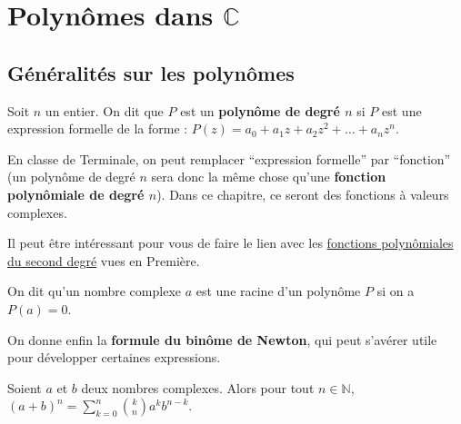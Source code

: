 	\section{Polynômes dans \texorpdfstring{$\mathbb{C}$}{C}}

	\subsection{Généralités sur les polynômes}

	\begin{formula}[Définition]
		Soit $n$ un entier. On dit que $P$ est un \textbf{polynôme de degré $n$} si $P$ est une expression formelle de la forme : $P(z) = a_0 + a_1 z + a_2 z^2 + \dots + a_n z^n$.
	\end{formula}

	En classe de Terminale, on peut remplacer ``expression formelle'' par ``fonction'' (un polynôme de degré $n$ sera donc la même chose qu'une \textbf{fonction polynômiale de degré $n$}). Dans ce chapitre, ce seront des fonctions à valeurs complexes.

	\begin{tip}
		Il peut être intéressant pour vous de faire le lien avec les \href{https://bacomathiqu.es/cours/premiere/polynomes-second-degre/}{fonctions polynômiales du second degré} vues en Première.
	\end{tip}

	\begin{formula}
		On dit qu'un nombre complexe $a$ est une racine d'un polynôme $P$ si on a $P(a) = 0$.
	\end{formula}

	On donne enfin la \textbf{formule du binôme de Newton}, qui peut s'avérer utile pour développer certaines expressions.

	\begin{formula}
		Soient $a$ et $b$ deux nombres complexes.
		\newpar
		Alors pour tout $n \in \mathbb{N}$, $\displaystyle{(a + b)^n = \sum_{k = 0}^n \binom{k}{n} a^k b^{n-k}}$.
	\end{formula}

